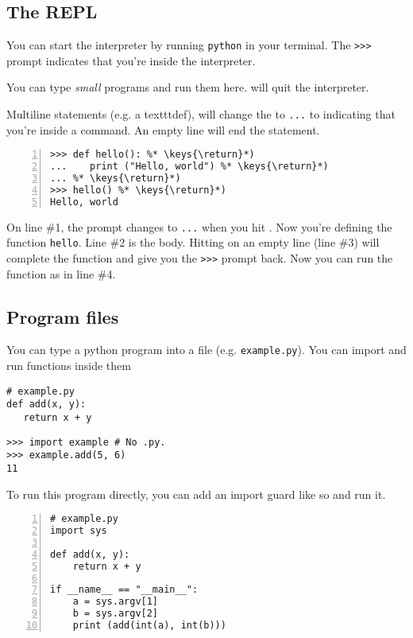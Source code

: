 \subsection{The REPL}
You can start the interpreter by running \texttt{python} in your
terminal. The \texttt{>>>} prompt indicates that you're inside the
interpreter. 

You can type \emph{small} programs and run them here.  will
quit the interpreter.

Multiline statements (e.g. a texttt{def}), will change the to \texttt{...} to
indicating that you're inside a command. An empty line will end the
statement.

\begin{lstlisting}[numbers=left, numberstyle=\tiny\color{gray}, xleftmargin={0.75cm}]
>>> def hello(): %* \keys{\return}*)
...    print ("Hello, world") %* \keys{\return}*)
... %* \keys{\return}*)
>>> hello() %* \keys{\return}*)
Hello, world
\end{lstlisting}

On line \#1, the prompt changes to \texttt{...} when you hit
\keys{\return}. Now you're defining the function \texttt{hello}. Line
\#2 is the body. Hitting \keys{\return} on an empty line (line \#3) will
complete the function and give you the \texttt{>>>} prompt back. Now
you can run the function as in line \#4.

\subsection{Program files}
You can type a python program into a file
(e.g. \texttt{example.py}). You can import and run functions inside
them  

\begin {lstlisting}
# example.py 
def add(x, y):
   return x + y
\end{lstlisting}

\begin {lstlisting}
>>> import example # No .py. 
>>> example.add(5, 6)
11
\end{lstlisting}

To run this program directly, you can add an import guard like so and
run it.

\begin {lstlisting}[numbers=left, numberstyle=\tiny\color{gray}, xleftmargin={0.75cm}]
# example.py 
import sys

def add(x, y):
    return x + y

if __name__ == "__main__":
    a = sys.argv[1]
    b = sys.argv[2]
    print (add(int(a), int(b)))
\end{lstlisting}

